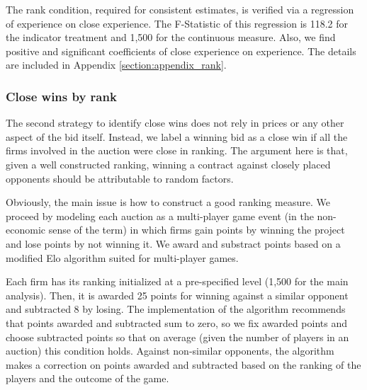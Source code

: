 

The rank condition, required for consistent estimates, is verified via a regression of experience on close experience. The F-Statistic of this regression is 118.2 for the indicator treatment and 1,500 for the continuous measure. Also, we find positive and significant coefficients of close experience on experience. The details are included in Appendix \ref{section:appendix_rank}.

\subsubsection{Close wins by rank}

The second strategy to identify close wins does not rely in prices or any other aspect of the bid itself. Instead, we label a winning bid as a close win if all the firms involved in the auction were close in ranking. The argument here is that, given a well constructed ranking, winning a contract against closely placed opponents should be attributable to random factors.

Obviously, the main issue is how to construct a good ranking measure. We proceed by  modeling each auction as a multi-player game event (in the non-economic sense of the term) in which firms gain points by winning the project and lose points by not winning it. We award and substract points based on a modified Elo algorithm suited for multi-player games.

Each firm has its ranking initialized at a pre-specified level (1,500 for the main analysis). Then, it is awarded 25 points for winning against a similar opponent and subtracted 8 by losing. The implementation of the algorithm recommends that points awarded and subtracted sum to zero, so we fix awarded points and choose subtracted points so that on average (given the number of players in an auction) this condition holds. Against non-similar opponents, the algorithm makes a correction on points awarded and subtracted based on the ranking of the players and the outcome of the game.

